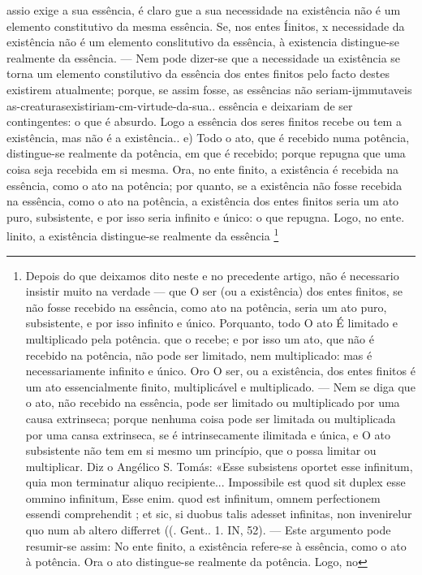 \documentclass[12pt,a4paper]{article}
\newcommand{\pagmark}[1]{\quad[\textit{p.\,#1}]\quad}
\begin{document}
{{{{{{{{{{{{{{{\pagmark{317}
 assio exige a sua essência, é claro gue a sua necessidade na existência não
é um elemento constitutivo da mesma essência. Se, nos entes Íinitos, x
necessidade da existência não é um elemento conslitutivo da essência, à existencia distingue-se realmente da essência. — Nem pode dizer-se que a necessidade ua existência se torna um elemento constilutivo da essência dos entes
finitos pelo facto destes existirem atualmente; porque, se assim fosse, as
essências não seriam-ijmmutaveis as-creaturasexistiriam-cm-virtude-da-sua..
essência e deixariam de ser contingentes: o que é absurdo. Logo a essência
dos seres finitos recebe ou tem a existência, mas não é a existência.. 
\pagmark{317}
  e) Todo o ato, que é recebido numa potência, distingue-se
realmente da potência, em que é recebido; porque repugna que
uma coisa seja recebida em si mesma. Ora, no ente finito, a
existência é recebida na essência, como o ato na potência; por
quanto, se a existência não fosse recebida na essência, como o
ato na potência, a existência dos entes finitos seria um ato
puro, subsistente, e por isso seria infinito e único: o que repugna. Logo, no ente. linito, a existência distingue-se realmente
da essência \footnote{Depois do que deixamos dito neste e no precedente artigo, não é
necessario insistir muito na verdade — que O ser (ou a existência) dos entes
finitos, se não fosse recebido na essência, como ato na potência, seria um
ato puro, subsistente, e por isso infinito e único. Porquanto, todo O ato É
limitado e multiplicado pela potência. que o recebe; e por isso um ato, que
não é recebido na potência, não pode ser limitado, nem multiplicado: mas é
necessariamente infinito e único. Oro O ser, ou a existência, dos entes finitos
é um ato essencialmente finito, multiplicável e multiplicado. — Nem se diga
que o ato, não recebido na essência, pode ser limitado ou multiplicado por
uma causa extrinseca; porque nenhuma coisa pode ser limitada ou multiplicada por uma cansa extrinseca, se é intrinsecamente ilimitada e única, e O
ato subsistente não tem em si mesmo um princípio, que o possa limitar ou
multiplicar. Diz o Angélico S. Tomás: «Esse subsistens oportet esse infinitum, quia mon terminatur aliquo recipiente... Impossibile est quod sit duplex
esse ommino infinitum, Esse enim. quod est infinitum, omnem perfectionem
essendi comprehendit ; et sic, si duobus talis adesset infinitas, non invenirelur quo num ab altero differret ((. Gent.. 1. IN, 52). — Este argumento
pode resumir-se assim: No ente finito, a existência refere-se à essência, como
o ato à potência. Ora o ato distingue-se realmente da potência. Logo, no
}}}}}}}}}}}}}}}}
\end{document}
